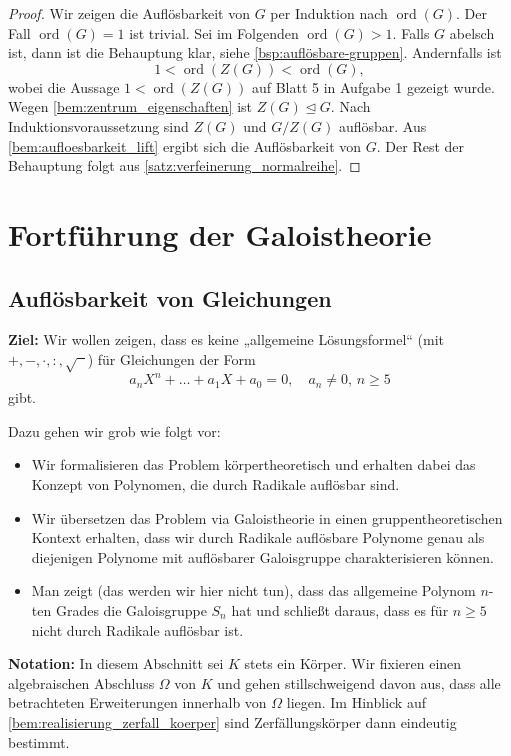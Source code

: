 \documentclass[a4paper, twoside, 11pt, ngerman]{report}
\DeclareMathOperator{\ord}{ord}
\theoremstyle{definistyle}
\theoremstyle{remark}
\begin{document}
\begin{proof}
Wir zeigen die Auflösbarkeit von $G$ per Induktion nach $\ord(G)$.
Der Fall $\ord(G) = 1$ ist trivial. Sei im Folgenden $\ord(G) > 1$. Falls $G$ abelsch ist, dann ist die Behauptung klar, siehe \ref{bsp:auflösbare-gruppen}.
Andernfalls ist
\[
1 < \ord(Z(G)) < \ord(G),
\]
wobei die Aussage $1 < \ord(Z(G))$ auf Blatt 5 in Aufgabe 1 gezeigt wurde.
Wegen \ref{bem:zentrum_eigenschaften} ist $Z(G) \trianglelefteq G$.
Nach Induktionsvoraussetzung sind $Z(G)$ und $G / Z(G)$ auflösbar. Aus \ref{bem:aufloesbarkeit_lift} ergibt sich die Auflösbarkeit von $G$. Der Rest der Behauptung folgt aus \ref{satz:verfeinerung_normalreihe}.
\end{proof}


\chapter{Fortführung der Galoistheorie}
\setcounter{section}{16}
\section{Auflösbarkeit von Gleichungen}

\textbf{Ziel:} Wir wollen zeigen, dass es keine „allgemeine Lösungsformel“ (mit $+, -, \cdot, :, \sqrt{\phantom{x}}$) für Gleichungen der Form 
\[
a_n X^n + \dots + a_1 X + a_0 = 0, \quad a_n \neq 0, \, n \geq 5
\]
gibt.

Dazu gehen wir grob wie folgt vor:
\begin{itemize}
    \item Wir formalisieren das Problem körpertheoretisch und erhalten dabei das Konzept von Polynomen, die durch Radikale auflösbar sind.
    \item Wir übersetzen das Problem via Galoistheorie in einen gruppentheoretischen Kontext erhalten, dass wir durch Radikale auflösbare Polynome genau als diejenigen Polynome
    mit auflösbarer Galoisgruppe charakterisieren können.
    \item Man zeigt (das werden wir hier nicht tun), dass das allgemeine Polynom $n$-ten Grades die Galoisgruppe $S_n$ hat
    und schließt daraus, dass es für $n \geq 5$ nicht durch Radikale auflösbar ist.
\end{itemize}

\textbf{Notation:} In diesem Abschnitt sei $K$ stets ein Körper. Wir fixieren einen algebraischen Abschluss $\Omega$ von $K$ und gehen stillschweigend davon aus, dass
alle betrachteten Erweiterungen innerhalb von $\Omega$ liegen. Im Hinblick auf \ref{bem:realisierung_zerfall_koerper} sind Zerfällungskörper dann eindeutig bestimmt.
\end{document}
